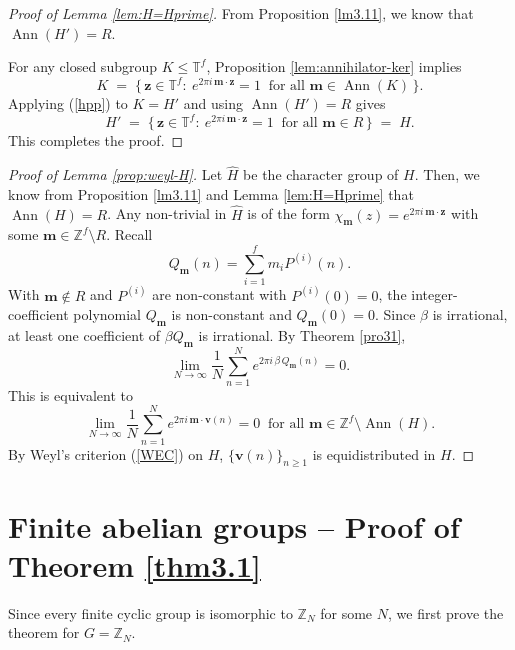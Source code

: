\documentclass[11pt]{article}
\DeclareMathOperator{\Ann}{Ann}
\def\Z{{\mathbb  Z}}
\def \Z{{\mathbb Z}}
\theoremstyle{definition}
\newcommand{\T}{\mathbb T}
\begin{document}
\begin{proof}[Proof of Lemma \ref{lem:H=Hprime}]
    From Proposition \ref{lm3.11}, we know that $\Ann(H')=R$.

For any closed subgroup $K\le \T^f$, Proposition \ref{lem:annihilator-ker} implies
\begin{equation}\label{hpp}
K \;=\; \{\, \mathbf{z}\in\T^f:\ e^{2\pi i\, \mathbf{m}\cdot \mathbf{z}}=1\ \text{ for all } \mathbf{m}\in \Ann(K)\,\}.
\end{equation}
Applying (\ref{hpp}) to $K=H'$ and using $\Ann(H')=R$ gives
\[
H' \;=\; \{\, \mathbf{z}\in\T^f:\ e^{2\pi i\, \mathbf{m}\cdot \mathbf{z}}=1\ \text{ for all } \mathbf{m}\in R\,\} \;=\; H.
\]
This completes the proof.
\end{proof}
\begin{proof}[Proof of Lemma \ref{prop:weyl-H}]
Let $\widehat H$ be the character group of $H$. Then, we know from Proposition \ref{lm3.11} and Lemma \ref{lem:H=Hprime} that $\Ann(H)=R$. Any non-trivial in $\widehat H$ is of the form
$\chi_\mathbf{m}(z)=e^{2\pi i\, \mathbf{m}\cdot \mathbf{z}}$ with some $\mathbf{m}\in\Z^f\setminus R$.
Recall
\[
Q_\mathbf{m}(n)=\sum_{i=1}^f m_i P^{(i)}(n).
\]
With $\mathbf{m}\notin R$ and $P^{(i)}$ are non-constant  with $P^{(i)}(0)=0$, the integer-coefficient polynomial $Q_\mathbf{m}$ is non-constant and $Q_\mathbf{m}(0)=0$.
Since $\beta$ is irrational, at least one coefficient of $\beta Q_\mathbf{m}$ is irrational. By Theorem \ref{pro31},
\[
\lim_{N\to\infty}\frac1N\sum_{n=1}^N e^{2\pi i\,\beta\, Q_\mathbf{m}(n)} =0.
\]
This is equivalent to 
\[\lim_{N\to\infty}\frac1N\sum_{n=1}^N e^{2\pi i\,\mathbf{m}\cdot \mathbf{v}(n)} =0        \ \text{ for all } \mathbf{m}\in \mathbb{Z}^f\setminus\Ann(H).\]
By Weyl's criterion (\ref{WEC}) on $H$, $\{\mathbf v(n)\}_{n\ge 1}$ is equidistributed in $H$.
\end{proof}





















\section{Finite abelian groups -- Proof of Theorem \ref{thm3.1}}
Since every finite cyclic group is isomorphic to $\mathbb{Z}_N$ for some $N$, we first prove the theorem for $G = \mathbb{Z}_N$.
\end{document}
